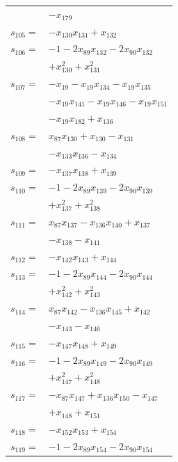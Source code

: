 \begin{longtable}{@{}r@{\;}l@{}}
 & \(\displaystyle -x_{179}\) \\[3pt]
\(s_{105}=\) & \(\displaystyle -x_{130}x_{131} +x_{132}\) \\[3pt]
\(s_{106}=\) & \(\displaystyle -1 -2x_{89}x_{132} -2x_{90}x_{132}\) \\
 & \(\displaystyle +x_{130}^{2} +x_{131}^{2}\) \\[3pt]
\(s_{107}=\) & \(\displaystyle -x_{19} -x_{19}x_{134} -x_{19}x_{135}\) \\
 & \(\displaystyle -x_{19}x_{141} -x_{19}x_{146} -x_{19}x_{151}\) \\
 & \(\displaystyle -x_{19}x_{182} +x_{136}\) \\[3pt]
\(s_{108}=\) & \(\displaystyle x_{87}x_{130} +x_{130} -x_{131}\) \\
 & \(\displaystyle -x_{133}x_{136} -x_{134}\) \\[3pt]
\(s_{109}=\) & \(\displaystyle -x_{137}x_{138} +x_{139}\) \\[3pt]
\(s_{110}=\) & \(\displaystyle -1 -2x_{89}x_{139} -2x_{90}x_{139}\) \\
 & \(\displaystyle +x_{137}^{2} +x_{138}^{2}\) \\[3pt]
\(s_{111}=\) & \(\displaystyle x_{87}x_{137} -x_{136}x_{140} +x_{137}\) \\
 & \(\displaystyle -x_{138} -x_{141}\) \\[3pt]
\(s_{112}=\) & \(\displaystyle -x_{142}x_{143} +x_{144}\) \\[3pt]
\(s_{113}=\) & \(\displaystyle -1 -2x_{89}x_{144} -2x_{90}x_{144}\) \\
 & \(\displaystyle +x_{142}^{2} +x_{143}^{2}\) \\[3pt]
\(s_{114}=\) & \(\displaystyle x_{87}x_{142} -x_{136}x_{145} +x_{142}\) \\
 & \(\displaystyle -x_{143} -x_{146}\) \\[3pt]
\(s_{115}=\) & \(\displaystyle -x_{147}x_{148} +x_{149}\) \\[3pt]
\(s_{116}=\) & \(\displaystyle -1 -2x_{89}x_{149} -2x_{90}x_{149}\) \\
 & \(\displaystyle +x_{147}^{2} +x_{148}^{2}\) \\[3pt]
\(s_{117}=\) & \(\displaystyle -x_{87}x_{147} +x_{136}x_{150} -x_{147}\) \\
 & \(\displaystyle +x_{148} +x_{151}\) \\[3pt]
\(s_{118}=\) & \(\displaystyle -x_{152}x_{153} +x_{154}\) \\[3pt]
\(s_{119}=\) & \(\displaystyle -1 -2x_{89}x_{154} -2x_{90}x_{154}\) \\

\end{longtable}
